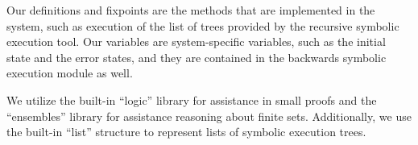 Our definitions and fixpoints are the methods that are implemented
in the system, such as execution of the list of trees provided by the recursive
symbolic execution tool. Our variables are system-specific variables, such as the
initial state and the error states, and they are contained in the backwards symbolic execution module as well.

We utilize the built-in ``logic'' library for assistance in small proofs and the ``ensembles'' library for assistance reasoning about finite sets. Additionally, we use the built-in ``list'' structure to represent lists of symbolic execution trees.








